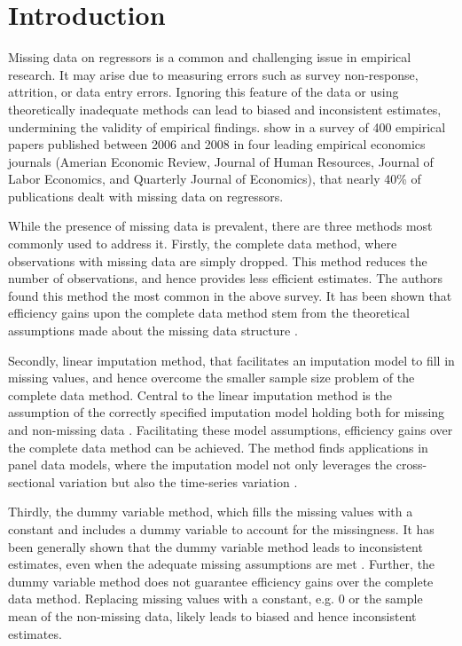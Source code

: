 \section{Introduction}
Missing data on regressors is a common and challenging issue in empirical research.
It may arise due to measuring errors such as survey non-response, attrition, or data entry errors.
Ignoring this feature of the data or using theoretically inadequate methods can lead to biased and inconsistent estimates, undermining the validity of empirical findings.
\citet{abrevaya2017} show in a survey of 400 empirical papers published between 2006 and 2008 in four leading empirical economics journals (Amerian Economic Review,
Journal of Human Resources, Journal of Labor Economics, and Quarterly Journal of Economics), that nearly 40\% of publications dealt with missing data on regressors.

While the presence of missing data is prevalent, there are three methods most commonly used to address it.
Firstly, the complete data method, where observations with missing data are simply dropped.
This method reduces the number of observations, and hence provides less efficient estimates.
The authors found this method the most common in the above survey.
It has been shown that efficiency gains upon the complete data method stem from the theoretical assumptions made about the missing data structure \citep{dardanoni2011}.

Secondly, linear imputation method, that facilitates an imputation model to fill in missing values, and hence overcome the smaller sample size problem of the complete data method.
Central to the linear imputation method is the assumption of the correctly specified imputation model holding both for missing and non-missing data \citep{dagenais1973, gourieroux1981}.
Facilitating these model assumptions, efficiency gains over the complete data method can be achieved.
The method finds applications in panel data models, where the imputation model not only leverages the cross-sectional variation but also the time-series variation \citep{frick2014}.

Thirdly, the dummy variable method, which fills the missing values with a constant and includes a dummy variable to account for the missingness.
It has been generally shown that the dummy variable method leads to inconsistent estimates, even when the adequate missing assumptions are met \citep{jones1996}.
Further, the dummy variable method does not guarantee efficiency gains over the complete data method.
Replacing missing values with a constant, e.g. 0 or the sample mean of the non-missing data, likely leads to biased and hence inconsistent estimates.

